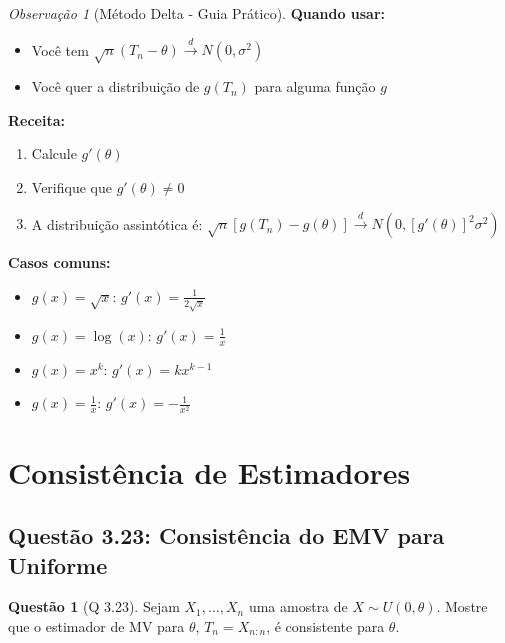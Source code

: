 \documentclass[12pt,a4paper]{article}
\theoremstyle{definition}
\newtheorem{questao}{Questão}[section]
\theoremstyle{remark}
\newtheorem{observacao}{Observação}[section]
\begin{document}
\begin{observacao}[Método Delta - Guia Prático]
\textbf{Quando usar:}
\begin{itemize}
    \item Você tem $\sqrt{n}(T_n - \theta) \xrightarrow{d} N(0, \sigma^2)$
    \item Você quer a distribuição de $g(T_n)$ para alguma função $g$
\end{itemize}

\textbf{Receita:}
\begin{enumerate}
    \item Calcule $g'(\theta)$
    \item Verifique que $g'(\theta) \neq 0$
    \item A distribuição assintótica é: $\sqrt{n}[g(T_n) - g(\theta)] \xrightarrow{d} N(0, [g'(\theta)]^2 \sigma^2)$
\end{enumerate}

\textbf{Casos comuns:}
\begin{itemize}
    \item $g(x) = \sqrt{x}$: $g'(x) = \frac{1}{2\sqrt{x}}$
    \item $g(x) = \log(x)$: $g'(x) = \frac{1}{x}$
    \item $g(x) = x^k$: $g'(x) = kx^{k-1}$
    \item $g(x) = \frac{1}{x}$: $g'(x) = -\frac{1}{x^2}$
\end{itemize}
\end{observacao}

\section{Consistência de Estimadores}

\subsection{Questão 3.23: Consistência do EMV para Uniforme}

\begin{questao}[Q 3.23]
Sejam $X_1, \ldots, X_n$ uma amostra de $X \sim U(0, \theta)$. Mostre que o estimador de MV para $\theta$, $T_n = X_{n:n}$, é consistente para $\theta$.
\end{questao}
\end{document}
